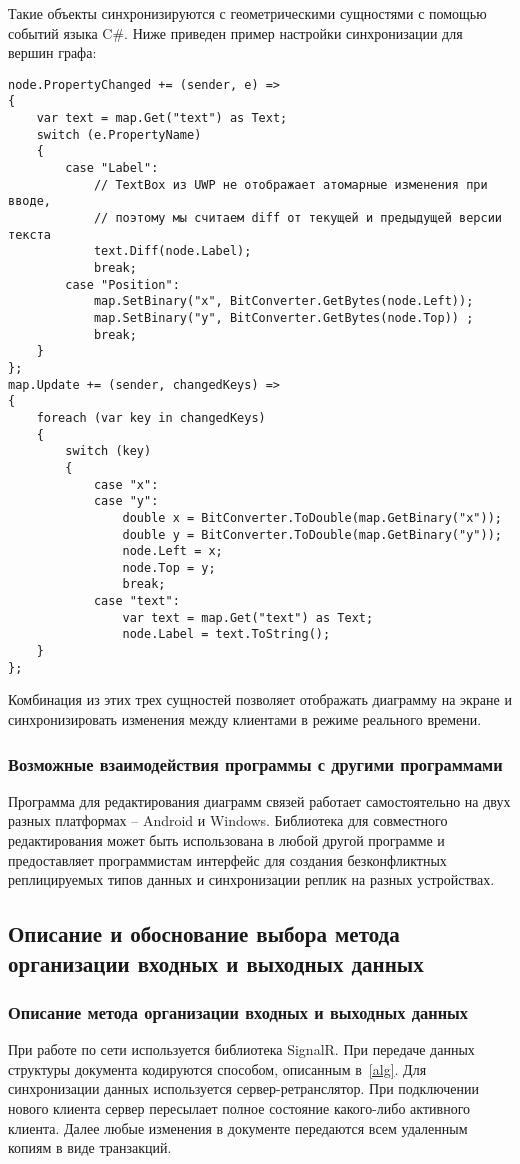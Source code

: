 \documentclass[a4paper,12pt]{article}
\begin{document}
    Такие объекты синхронизируются с геометрическими сущностями с помощью событий языка C\#. Ниже приведен пример настройки синхронизации для вершин графа:
    \begin{verbatim}
node.PropertyChanged += (sender, e) =>
{
    var text = map.Get("text") as Text;
    switch (e.PropertyName)
    {
        case "Label":
            // TextBox из UWP не отображает атомарные изменения при вводе,
            // поэтому мы считаем diff от текущей и предыдущей версии текста
            text.Diff(node.Label);
            break;
        case "Position":
            map.SetBinary("x", BitConverter.GetBytes(node.Left));
            map.SetBinary("y", BitConverter.GetBytes(node.Top)) ;
            break;
    }
};
map.Update += (sender, changedKeys) =>
{
    foreach (var key in changedKeys)
    {
        switch (key)
        {
            case "x":
            case "y":
                double x = BitConverter.ToDouble(map.GetBinary("x"));
                double y = BitConverter.ToDouble(map.GetBinary("y"));
                node.Left = x;
                node.Top = y;
                break;
            case "text":
                var text = map.Get("text") as Text;
                node.Label = text.ToString();
    }
};
    \end{verbatim}

    Комбинация из этих трех сущностей позволяет отображать диаграмму на экране и синхронизировать изменения между клиентами в режиме реального времени.

    \subsubsection{Возможные взаимодействия программы с другими программами}
    Программа для редактирования диаграмм связей работает самостоятельно на двух разных платформах -- Android и Windows. Библиотека для совместного редактирования может быть использована в любой другой программе и предоставляет программистам интерфейс для создания безконфликтных реплицируемых типов данных и синхронизации реплик на разных устройствах.

    \subsection{Описание и обоснование выбора метода организации входных и выходных данных}

    \subsubsection{Описание метода организации входных и выходных данных}
    При работе по сети используется библиотека SignalR. При передаче данных структуры документа кодируются способом, описанным в~\ref{alg}.
    Для синхронизации данных используется сервер-ретранслятор. При подключении нового клиента сервер пересылает полное состояние какого-либо активного клиента. Далее любые изменения в документе передаются всем удаленным копиям в виде транзакций.
\end{document}
